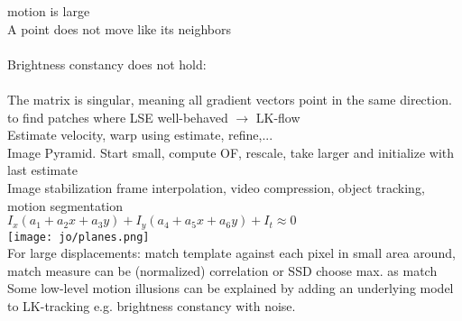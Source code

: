  motion is large \\
A point does not move like its neighbors \\
\\
Brightness constancy does not hold:\\
 \\
The matrix is singular, meaning all gradient vectors point in the same direction.\\
 to find patches where LSE well-behaved $\rightarrow$ LK-flow\\
 Estimate velocity, warp using estimate, refine,...\\
 Image Pyramid. Start small, compute OF, rescale, take larger and initialize with last estimate\\
 Image stabilization  frame interpolation, video compression, object tracking, motion segmentation\\
 $I_x(a_1 + a_2x + a_3y) + I_y(a_4 + a_5x + a_6y) + I_t \approx 0$ \\ \texttt{[image: jo/planes.png]}\\
 For large displacements: match template against each pixel in small area around, match measure can be (normalized) correlation or SSD choose max. as match \\
 Some low-level motion illusions can be explained by adding an underlying model to LK-tracking e.g. brightness constancy with noise.
